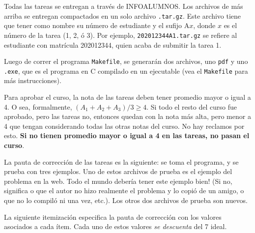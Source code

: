 \documentclass[11pt]{article}
\begin{document}
Todas las tareas se entregan a trav\'es de INFOALUMNOS. Los archivos
de m\'as arriba se entregan compactados en un solo archivo
\verb+.tar.gz+. Este archivo tiene que tener como nombre su n\'umero
de estudiante y el sufijo A$x$, donde $x$ es el n\'umero de la tarea
(1, 2, \'o 3). Por ejemplo, \verb+202012344A1.tar.gz+ se refiere al
estudiante con matr\'icula 202012344, quien acaba de submitir la tarea
1.

Luego de correr el programa \verb+Makefile+, se generar\'an dos
archivos, uno \verb+pdf+ y uno \verb+.exe+, que es el programa en C
compilado en un ejecutable (vea el \verb+Makefile+ para m\'as
instrucciones).

 Para aprobar el curso, la nota de las
tareas deben tener promedio mayor o igual a 4. O sea, formalmente,
$(A_1+A_2+A_3)/3 \geq 4$. Si todo el resto del curso fue aprobado,
pero las tareas no, entonces quedan con la nota m\'as alta, pero menor
a 4 que tengan considerando todas las otras notas del curso. No hay
reclamos por esto. {\bf Si no tienen promedio mayor o igual a 4 en las
  tareas, no pasan el curso}.

La pauta de correcci\'on de las tareas es la siguiente: se toma el
programa, y se prueba con tres ejemplos. Uno de estos archivos de
prueba es el ejemplo del problema en la web. Todo el mundo deber\'ia
tener este ejemplo bien! (Si no, significa o que el autor no hizo
realmente el problema y lo copi\'o de un amigo, o que no lo compil\'o
ni una vez, etc.). Los otros dos archivos de prueba son nuevos.

La siguiente itemizaci\'on especifica la pauta de correcci\'on con los
valores asociados a cada \'item. Cada uno de estos valores {\em se
  descuenta} del 7 ideal.
\end{document}

